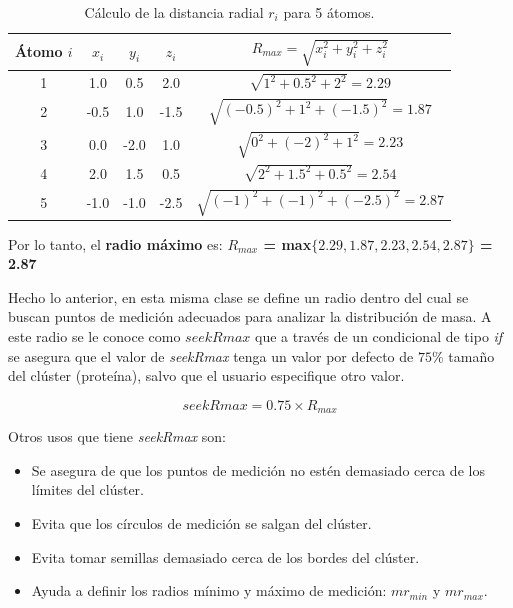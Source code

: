  	\begin{table}[h!]
 		\centering
 		\begin{tabular}{ccccc}
 			\textbf{Átomo \(i\)} & \textbf{\(x_i\)} & \textbf{\(y_i\)} & \textbf{\(z_i\)} & \(R_{max}= \sqrt{x_i^2 + y_i^2 + z_i^2}\) \\
 			\hline
 			1 & 1.0 & 0.5 & 2.0 & \(\sqrt{1^2 + 0.5^2 + 2^2} = 2.29\) \\
 			2 & -0.5 & 1.0 & -1.5 & \(\sqrt{(-0.5)^2 + 1^2 + (-1.5)^2} = 1.87\) \\
 			3 & 0.0 & -2.0 & 1.0 & \(\sqrt{0^2 + (-2)^2 + 1^2} = 2.23\) \\
 			4 & 2.0 & 1.5 & 0.5 & \(\sqrt{2^2 + 1.5^2 + 0.5^2} = 2.54\) \\
 			5 & -1.0 & -1.0 & -2.5 & \(\sqrt{(-1)^2 + (-1)^2 + (-2.5)^2} = 2.87\) \\
 		\end{tabular}
 		\caption{Cálculo de la distancia radial \(r_i\) para 5 átomos.}
 	\end{table}
 	
 	Por lo tanto, el \textbf{radio máximo} 
 	es: \textbf{\(R_{max}\) = max\(\{2.29, 1.87, 2.23, 2.54, 2.87\}\) = 2.87}
 	
 	Hecho lo anterior, en esta misma clase se define un radio dentro del cual se buscan puntos
 	 de medición adecuados para analizar la distribución de masa. A este radio se le conoce
 	  como $seekRmax$ que a través de un condicional de tipo \textit{if} se asegura que el valor 
 	  de \textit{seekRmax} tenga un valor por defecto de $75\%$ tamaño del clúster (proteína), 
 	  salvo que el usuario especifique otro valor.
 	
 	\begin{equation}
 		 	seekRmax = 0.75 \times R_{max} 
 	\end{equation}
 	
 	Otros usos que tiene \textit{seekRmax} son:
 	
 	\begin{itemize}
 		\item Se asegura de que los puntos de medición no estén demasiado cerca de los límites del clúster.
 		\item Evita que los círculos de medición se salgan del clúster.
 		\item Evita tomar semillas demasiado cerca de los bordes del clúster.
 		\item Ayuda a definir los radios mínimo y máximo de medición: $mr_{min}$ y $mr_{max}$.
 	\end{itemize}
 

